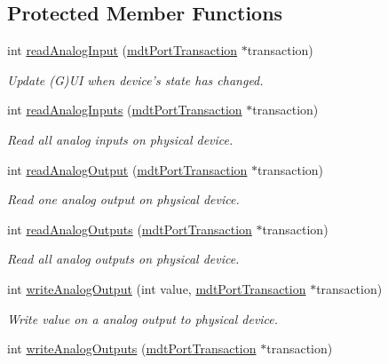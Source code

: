 \subsection*{Protected Member Functions}
\begin{DoxyCompactItemize}
\item 
int \hyperlink{classmdt_device_modbus_aa2a024793ae2a5e81c7e92260a70cd9e}{readAnalogInput} (\hyperlink{classmdt_port_transaction}{mdtPortTransaction} $\ast$transaction)
\begin{DoxyCompactList}\small\item\em Update (G)UI when device's state has changed. \end{DoxyCompactList}\item 
int \hyperlink{classmdt_device_modbus_a846af6dbf80bbf747f3f966420ef6f92}{readAnalogInputs} (\hyperlink{classmdt_port_transaction}{mdtPortTransaction} $\ast$transaction)
\begin{DoxyCompactList}\small\item\em Read all analog inputs on physical device. \end{DoxyCompactList}\item 
int \hyperlink{classmdt_device_modbus_a30c815cbe5e603e8114dcbc09849e322}{readAnalogOutput} (\hyperlink{classmdt_port_transaction}{mdtPortTransaction} $\ast$transaction)
\begin{DoxyCompactList}\small\item\em Read one analog output on physical device. \end{DoxyCompactList}\item 
int \hyperlink{classmdt_device_modbus_ae02dd44f1d873fcc15ff75d781b62b0b}{readAnalogOutputs} (\hyperlink{classmdt_port_transaction}{mdtPortTransaction} $\ast$transaction)
\begin{DoxyCompactList}\small\item\em Read all analog outputs on physical device. \end{DoxyCompactList}\item 
int \hyperlink{classmdt_device_modbus_ac63297a31205759622f341525c34251f}{writeAnalogOutput} (int value, \hyperlink{classmdt_port_transaction}{mdtPortTransaction} $\ast$transaction)
\begin{DoxyCompactList}\small\item\em Write value on a analog output to physical device. \end{DoxyCompactList}\item 
int \hyperlink{classmdt_device_modbus_a87af02c83cede03d6ee988c678e0fc00}{writeAnalogOutputs} (\hyperlink{classmdt_port_transaction}{mdtPortTransaction} $\ast$transaction)

\end{DoxyCompactItemize}
